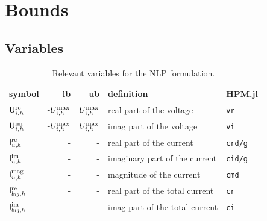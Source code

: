 \documentclass[journal]{IEEEtran}
\begin{document}
\section{Bounds}



\subsection{Variables}

\begin{table}[H]
    \centering
    \caption{Relevant variables for the NLP formulation.}
    \label{tab:variables_nlp}
    \begin{tabular}{l r r l l }
        symbol                                                  & lb                                    & ub                                        & definition                                & HPM.jl            \\ \hline
        $\mathsf{U}^{\text{re}}_{i,h}$                        & -$U^{\text{max}}_{i,h}$  & $U^{\text{max}}_{i,h}$       & real part of the voltage                  & \texttt{vr}       \\
        $\mathsf{U}^{\text{im}}_{i,h}$                   & -$U^{\text{max}}_{i,h}$  & $U^{\text{max}}_{i,h}$       & imag part of the voltage                  & \texttt{vi}       \\ \hline
        $\mathsf{I}^{\text{re}}_{u,h}$                        & -                                     & -                                         & real part of the current                  & \texttt{crd/g}    \\ 
        $\mathsf{I}^{\text{im}}_{u,h}$                   & -                                     & -                                         & imaginary part of the current             & \texttt{cid/g}    \\ 
        $\mathsf{I}^{\text{mag}}_{u,h}$                   & -                                     & -                                         & magnitude of the current                  & \texttt{cmd}      \\ \hline
        $\mathsf{I}^{\text{re}}_{bij,h}$                   & -                                     & -                                         & real part of the total current            & \texttt{cr}       \\ 
        $\mathsf{I}^{\text{im}}_{bij,h}$              & -                                     & -                                         & imag part of the total current            & \texttt{ci}       \\ 

\end{tabular}
\end{table}
\end{document}

